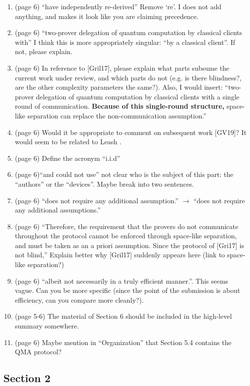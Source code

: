 \documentclass[12pt]{article}
\newcommand{\Leash}{{\sf Leash }}
\begin{document}
\begin{enumerate}
\item (page 6) ``have independently re-derived'' Remove `re'. I does not add anything, and makes it look like you are claiming precedence.
\item (page 6) ``two-prover delegation of quantum computation by classical
clients with'' I think this is more appropriately singular: ``by a classical client''. If not, please explain.
\item (page 6) In reference to [Gril17], please explain what parts subsume the current work under review, and which parts do not (e.g. is there blindness?, are the other complexity parameters the same?). Also, I would insert: ``two-prover delegation of quantum computation by classical
clients with a single round of communication. \textbf{Because of this single-round structure,} space-like separation can replace the
non-communication assumption.''
\item (page 6) Would it be appropriate to comment on subsequent work [GV19]? It would seem to be related to \Leash.
    \item (page 6) Define the acronym ``i.i.d''
    \item (page 6)``and could not use'' not clear who is the subject of this part: the ``authors'' or the ``devices''. Maybe break into two sentences.
\item (page 6) ``does not require any additional assumption.'' $\rightarrow$ ``does not require any additional assumptions.''
\item (page 6) ``Therefore, the requirement that the provers do not
communicate throughout the protocol cannot be enforced through space-like separation, and must be taken
as an a priori assumption. Since the protocol of [Gri17] is not blind,'' Explain better why [Gril17] suddenly appears here (link to space-like separation?)
\item (page 6) ``albeit not necessarily in a truly efficient manner.''. This seems vague. Can you be more specific (since the point of the submission is about efficiency, can you compare more cleanly?).
\item (page 5-6) The material of Section 6 should be included in the high-level summary somewhere.
\item (page 6) Maybe mention in ``Organization'' that Section 5.4 contains the QMA protocol?
\end{enumerate}


\subsection*{Section 2}
\end{document}
